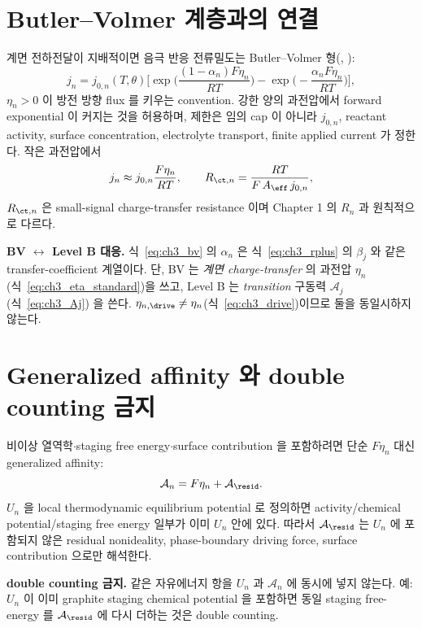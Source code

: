 \section{Butler--Volmer 계층과의 연결}\label{sec:ch3_bv}
계면 전하전달이 지배적이면 음극 반응 전류밀도는 Butler--Volmer 형(\cite{bardfaulkner,newman2004}, ):
\begin{equation}
j_n=j_{0,n}(T,\theta)\Big[\exp\!\Big(\frac{(1-\alpha_n)F\eta_n}{RT}\Big)-\exp\!\Big(-\frac{\alpha_n F\eta_n}{RT}\Big)\Big],
\label{eq:ch3_bv}
\end{equation}
$\eta_n>0$ 이 방전 방향 flux 를 키우는 convention. 강한 양의 과전압에서 forward exponential 이 커지는 것을
허용하며, 제한은 임의 cap 이 아니라 $j_{0,n}$, reactant activity, surface concentration, electrolyte
transport, finite applied current 가 정한다. 작은 과전압에서
\begin{equation}
j_n\approx j_{0,n}\frac{F\eta_n}{RT},\qquad
R_{\ct,n}=\frac{RT}{F\,A_{\eff}\,j_{0,n}},
\label{eq:ch3_rct}
\end{equation}
$R_{\ct,n}$ 은 small-signal charge-transfer resistance 이며 Chapter 1 의 $R_n$ 과 원칙적으로 다르다.
\begin{boundbox}
\textbf{BV $\leftrightarrow$ Level B 대응.} 식~\eqref{eq:ch3_bv} 의 $\alpha_n$ 은 식~\eqref{eq:ch3_rplus}
의 $\beta_j$ 와 같은 transfer-coefficient 계열이다. 단, BV 는 \emph{계면 charge-transfer} 의 과전압 $\eta_n$
(식~\eqref{eq:ch3_eta_standard})을 쓰고, Level B 는 \emph{transition} 구동력 $\mathcal A_j$(식~\eqref{eq:ch3_Aj})
을 쓴다. $\eta_{n,\drive}\ne\eta_n$(식~\eqref{eq:ch3_drive})이므로 둘을 동일시하지 않는다.
\end{boundbox}

\section{Generalized affinity 와 double counting 금지}\label{sec:ch3_genaff}
비이상 열역학$\cdot$staging free energy$\cdot$surface contribution 을 포함하려면 단순 $F\eta_n$ 대신
generalized affinity:
\begin{equation}
\mathcal A_n=F\eta_n+\mathcal A_{\resid}.
\label{eq:ch3_genaff}
\end{equation}
$U_n$ 을 local thermodynamic equilibrium potential 로 정의하면 activity/chemical potential/staging free
energy 일부가 이미 $U_n$ 안에 있다. 따라서 $\mathcal A_{\resid}$ 는 $U_n$ 에 포함되지 않은 residual
nonideality, phase-boundary driving force, surface contribution 으로만 해석한다.
\begin{mdframed}
\textbf{double counting 금지.} 같은 자유에너지 항을 $U_n$ 과 $\mathcal A_n$ 에 동시에 넣지 않는다. 예: $U_n$ 이
이미 graphite staging chemical potential 을 포함하면 동일 staging free-energy 를 $\mathcal A_{\resid}$ 에
다시 더하는 것은 double counting.
\end{mdframed}

